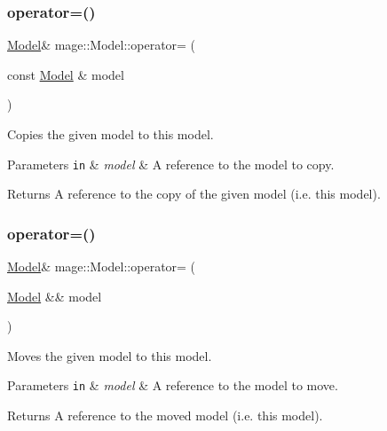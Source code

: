 \subsubsection{\texorpdfstring{operator=()}{operator=()}\hspace{0.1cm}{\footnotesize\ttfamily [1/2]}}
{\footnotesize\ttfamily \hyperlink{classmage_1_1_model}{Model}\& mage\+::\+Model\+::operator= (\begin{DoxyParamCaption}\item[{const \hyperlink{classmage_1_1_model}{Model} \&}]{model }\end{DoxyParamCaption})\hspace{0.3cm}{\ttfamily [delete]}}

Copies the given model to this model.


\begin{DoxyParams}[1]{Parameters}
\mbox{\tt in}  & {\em model} & A reference to the model to copy. \\
\hline
\end{DoxyParams}
\begin{DoxyReturn}{Returns}
A reference to the copy of the given model (i.\+e. this model). 
\end{DoxyReturn}
\hypertarget{classmage_1_1_model_a084e30d15822bfefa79128f30a57cc02}{}\label{classmage_1_1_model_a084e30d15822bfefa79128f30a57cc02} 
\subsubsection{\texorpdfstring{operator=()}{operator=()}\hspace{0.1cm}{\footnotesize\ttfamily [2/2]}}
{\footnotesize\ttfamily \hyperlink{classmage_1_1_model}{Model}\& mage\+::\+Model\+::operator= (\begin{DoxyParamCaption}\item[{\hyperlink{classmage_1_1_model}{Model} \&\&}]{model }\end{DoxyParamCaption})\hspace{0.3cm}{\ttfamily [delete]}}

Moves the given model to this model.


\begin{DoxyParams}[1]{Parameters}
\mbox{\tt in}  & {\em model} & A reference to the model to move. \\
\hline
\end{DoxyParams}
\begin{DoxyReturn}{Returns}
A reference to the moved model (i.\+e. this model). 
\end{DoxyReturn}
\hypertarget{classmage_1_1_model_a0083c64e8199db23b78a9281be84685f}{}\label{classmage_1_1_model_a0083c64e8199db23b78a9281be84685f} 

